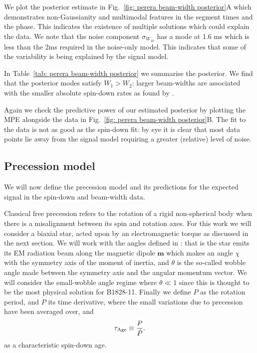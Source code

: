 \documentclass[../full_thesis/full_thesis.tex]{subfiles}
\newcommand{\thisdir}{../comparing_periodic_modulations}
\newcommand{\Wone}{W_{1}}
\newcommand{\Wtwo}{W_{2}}
\newcommand{\bigfigurecaptions}[2]{
$\textbf{A}$: The estimated marginal posterior probability distribution for the
#1 #2 model parameters. $\textbf{B}$: Checking the fit of the model using the
maximum posterior values to the data; see Fig.~\ref{fig: noise-only beam-width
posterior fit} for a complete description.}
\begin{document}
We plot the posterior estimate
in Fig.~\ref{fig: perera beam-width posterior}A which demonstrates
non-Gaussianity and multimodal features in the segment times and the
phase. This indicates the existence of multiple solutions which could explain the
data. We note that the noise component $\sigma_{W_{10}}$ has a mode at 1.6 ms
which is less than the 2ms required in the noise-only model. This indicates
that some of the variability is being explained by the signal model.
\begin{figure*}
\centering
\texttt{[image: \{Beamwidth\_Switching\_0.1\_PosteriorWithFit]}.pdf}
\caption{\bigfigurecaptions{Switching}{beam-width}}
\label{fig: perera beam-width posterior}
\end{figure*}
In Table~\ref{tab: perera beam-width posterior} we summarise the posterior. We
find that the posterior modes satisfy $\Wone > \Wtwo$: larger
beam-widths are associated with the smaller absolute spin-down rates as found
by \citet{Lyne2010}.
\begin{table}
\centering
\caption{Posterior estimates for the beam-width switching model.}
\label{tab: perera beam-width posterior}

\end{table}

Again we check the predictive power of our estimated posterior by plotting the
MPE alongside the data in Fig.~\ref{fig: perera beam-width posterior}B. The fit
to the data is not as good as the spin-down fit: by eye it is clear that most
data points lie away from the signal model requiring a greater (relative) level
of noise.

\subsection{Precession model}
\label{sec: The precession model}

We will now define the precession model and its predictions for the expected
signal in the spin-down and beam-width data.

Classical free precession refers to the rotation of a rigid non-spherical body
when there is a misalignment between its spin and rotation axes. For this work
we will consider a biaxial star, acted upon by an electromagnetic torque as
discussed in the next section. We will work with the angles defined in
\citet{Jones2001}: that is the star emits its EM radiation beam along the magnetic
dipole $\mathbf{m}$ which makes an angle $\chi$ with the symmetry axis of the
moment of inertia, and $\theta$ is the so-called wobble angle made between the
symmetry axis and the angular momentum vector. We will consider the
small-wobble angle regime where $\theta \ll 1$ since this is thought to be the
most physical solution for B1828-11.  Finally we define $P$ as the rotation
period, and $\dot P$ its time derivative, where the small variations due to
precession have been averaged over, and
\begin{align}
    \tau_{\mathrm{Age}} \equiv  \frac{P}{\dot P}.
\end{align}
as a characteristic spin-down age.
\end{document}
